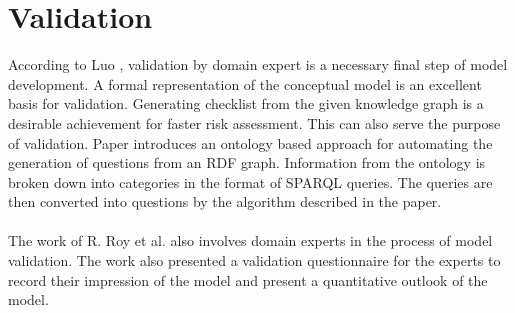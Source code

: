 \section{Validation}

According to Luo \cite{Luo2016}, validation by domain expert is a necessary final step of model development. A formal representation of the conceptual model is an excellent
basis for validation. Generating checklist from the given knowledge graph is a desirable achievement for faster risk assessment. This can also serve the purpose of validation. Paper \cite{9297991} introduces an ontology based approach for automating the generation of questions from an RDF graph. Information from the ontology is broken down into categories in the format of SPARQL queries. The queries are then converted into questions by the algorithm described in the paper.

\paragraph{} The work of R. Roy et al. \cite{Roy2004} also involves domain experts in the process of model validation. The work also presented a validation questionnaire for the experts to record their impression of the model and present a quantitative outlook of the model.